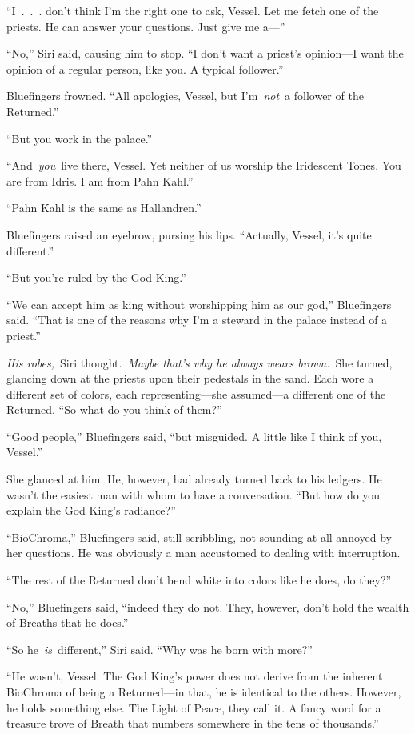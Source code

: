 “I~.~.~. don’t think I’m the right one to ask, Vessel. Let me fetch one of the priests. He can answer your questions. Just give me a—”

“No,” Siri said, causing him to stop. “I don’t want a priest’s opinion—I want the opinion of a regular person, like you. A typical follower.”

Bluefingers frowned. “All apologies, Vessel, but I’m~\textit{not}~a follower of the Returned.”

“But you work in the palace.”

“And~\textit{you}~live there, Vessel. Yet neither of us worship the Iridescent Tones. You are from Idris. I am from Pahn Kahl.”

“Pahn Kahl is the same as Hallandren.”

Bluefingers raised an eyebrow, pursing his lips. “Actually, Vessel, it’s quite different.”

“But you’re ruled by the God King.”

“We can accept him as king without worshipping him as our god,” Bluefingers said. “That is one of the reasons why I’m a steward in the palace instead of a priest.”

\textit{His robes,}~Siri thought.~\textit{Maybe that’s why he always wears brown.}~She turned, glancing down at the priests upon their pedestals in the sand. Each wore a different set of colors, each representing—she assumed—a different one of the Returned. “So what do you think of them?”

“Good people,” Bluefingers said, “but misguided. A little like I think of you, Vessel.”

She glanced at him. He, however, had already turned back to his ledgers. He wasn’t the easiest man with whom to have a conversation. “But how do you explain the God King’s radiance?”

“BioChroma,” Bluefingers said, still scribbling, not sounding at all annoyed by her questions. He was obviously a man accustomed to dealing with interruption.

“The rest of the Returned don’t bend white into colors like he does, do they?”

“No,” Bluefingers said, “indeed they do not. They, however, don’t hold the wealth of Breaths that he does.”

“So he~\textit{is}~different,” Siri said. “Why was he born with more?”

“He wasn’t, Vessel. The God King’s power does not derive from the inherent BioChroma of being a Returned—in that, he is identical to the others. However, he holds something else. The Light of Peace, they call it. A fancy word for a treasure trove of Breath that numbers somewhere in the tens of thousands.”

